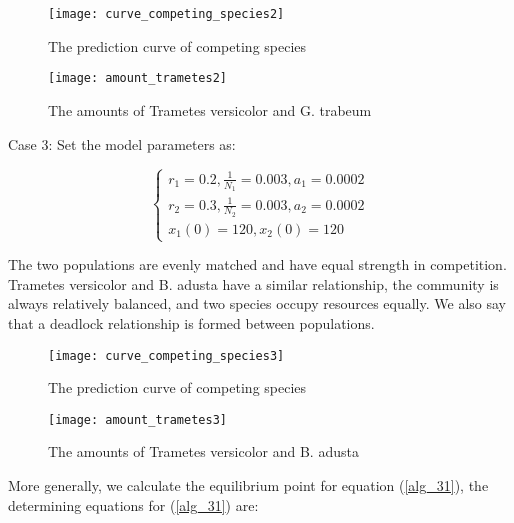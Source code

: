\documentclass{mcmthesis}
\begin{document}
\begin{figure}[H]
  \centering
  \subfigure
  {
    \begin{minipage}[b]{.4\linewidth}
      \centering
      \texttt{[image: curve\_competing\_species2]}
      \caption{The prediction curve of competing species}
    \end{minipage}
  }\quad \quad \quad \quad \quad \quad
  \subfigure
  {
    \begin{minipage}[b]{.4\linewidth}
      \centering
      \texttt{[image: amount\_trametes2]}
      \caption{The amounts of Trametes versicolor and G. trabeum}
    \end{minipage}
  }
\end{figure}

Case 3: Set the model parameters as: 

\begin{equation}
  \left\{\begin{array}{l}
    r_{1}=0.2, \frac{1}{N_{1}}=0.003, a_{1}=0.0002 \\
    r_{2}=0.3, \frac{1}{N_{2}}=0.003, a_{2}=0.0002 \\
    x_{1}(0)=120, x_{2}(0)=120
    \end{array}\right.
  \label{alg_34}
\end{equation}

The two populations are evenly matched and have equal strength in competition. Trametes versicolor and B. adusta have a similar relationship, the community is always relatively balanced, and two species occupy resources equally. We also say that a deadlock relationship is formed between populations.

\begin{figure}[H]
  \centering
  \subfigure
  {
    \begin{minipage}[b]{.4\linewidth}
      \centering
      \texttt{[image: curve\_competing\_species3]}
      \caption{The prediction curve of competing species}
    \end{minipage}
  }\quad \quad \quad \quad \quad \quad
  \subfigure
  {
    \begin{minipage}[b]{.4\linewidth}
      \centering
      \texttt{[image: amount\_trametes3]}
      \caption{The amounts of Trametes versicolor and B. adusta}
    \end{minipage}
  }
\end{figure}

More generally, we calculate the equilibrium point for equation (\ref{alg_31}), the determining equations for (\ref{alg_31}) are:
\end{document}
